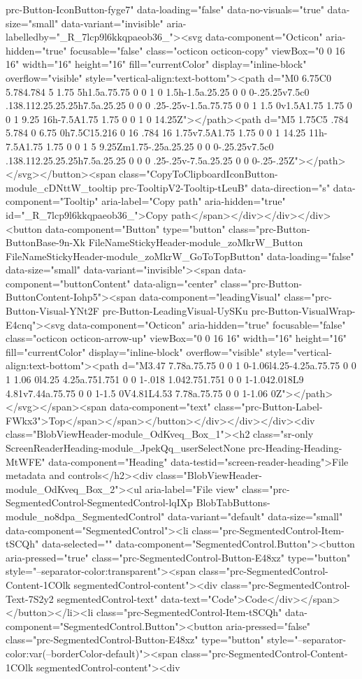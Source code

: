 prc-Button-IconButton-fyge7" data-loading="false" data-no-visuals="true" data-size="small" data-variant="invisible" aria-labelledby="_R_7lcp9l6kkqpaeob36_"><svg data-component="Octicon" aria-hidden="true" focusable="false" class="octicon octicon-copy" viewBox="0 0 16 16" width="16" height="16" fill="currentColor" display="inline-block" overflow="visible" style="vertical-align:text-bottom"><path d="M0 6.75C0 5.784.784 5 1.75 5h1.5a.75.75 0 0 1 0 1.5h-1.5a.25.25 0 0 0-.25.25v7.5c0 .138.112.25.25.25h7.5a.25.25 0 0 0 .25-.25v-1.5a.75.75 0 0 1 1.5 0v1.5A1.75 1.75 0 0 1 9.25 16h-7.5A1.75 1.75 0 0 1 0 14.25Z"></path><path d="M5 1.75C5 .784 5.784 0 6.75 0h7.5C15.216 0 16 .784 16 1.75v7.5A1.75 1.75 0 0 1 14.25 11h-7.5A1.75 1.75 0 0 1 5 9.25Zm1.75-.25a.25.25 0 0 0-.25.25v7.5c0 .138.112.25.25.25h7.5a.25.25 0 0 0 .25-.25v-7.5a.25.25 0 0 0-.25-.25Z"></path></svg></button><span class="CopyToClipboardIconButton-module_cDNttW_tooltip prc-TooltipV2-Tooltip-tLeuB" data-direction="s" data-component="Tooltip" aria-label="Copy path" aria-hidden="true" id="_R_7lcp9l6kkqpaeob36_">Copy path</span></div></div></div><button data-component="Button" type="button" class="prc-Button-ButtonBase-9n-Xk FileNameStickyHeader-module_zoMkrW_Button FileNameStickyHeader-module_zoMkrW_GoToTopButton" data-loading="false" data-size="small" data-variant="invisible"><span data-component="buttonContent" data-align="center" class="prc-Button-ButtonContent-Iohp5"><span data-component="leadingVisual" class="prc-Button-Visual-YNt2F prc-Button-LeadingVisual-UySKu prc-Button-VisualWrap-E4cnq"><svg data-component="Octicon" aria-hidden="true" focusable="false" class="octicon octicon-arrow-up" viewBox="0 0 16 16" width="16" height="16" fill="currentColor" display="inline-block" overflow="visible" style="vertical-align:text-bottom"><path d="M3.47 7.78a.75.75 0 0 1 0-1.06l4.25-4.25a.75.75 0 0 1 1.06 0l4.25 4.25a.751.751 0 0 1-.018 1.042.751.751 0 0 1-1.042.018L9 4.81v7.44a.75.75 0 0 1-1.5 0V4.81L4.53 7.78a.75.75 0 0 1-1.06 0Z"></path></svg></span><span data-component="text" class="prc-Button-Label-FWkx3">Top</span></span></button></div></div></div><div class="BlobViewHeader-module_OdKveq_Box_1"><h2 class="sr-only ScreenReaderHeading-module_JpekQq_userSelectNone prc-Heading-Heading-MtWFE" data-component="Heading" data-testid="screen-reader-heading">File metadata and controls</h2><div class="BlobViewHeader-module_OdKveq_Box_2"><ul aria-label="File view" class="prc-SegmentedControl-SegmentedControl-lqIXp BlobTabButtons-module_no8dpa_SegmentedControl" data-variant="default" data-size="small" data-component="SegmentedControl"><li class="prc-SegmentedControl-Item-tSCQh" data-selected="" data-component="SegmentedControl.Button"><button aria-pressed="true" class="prc-SegmentedControl-Button-E48xz" type="button" style="--separator-color:transparent"><span class="prc-SegmentedControl-Content-1COlk segmentedControl-content"><div class="prc-SegmentedControl-Text-7S2y2 segmentedControl-text" data-text="Code">Code</div></span></button></li><li class="prc-SegmentedControl-Item-tSCQh" data-component="SegmentedControl.Button"><button aria-pressed="false" class="prc-SegmentedControl-Button-E48xz" type="button" style="--separator-color:var(--borderColor-default)"><span class="prc-SegmentedControl-Content-1COlk segmentedControl-content"><div 